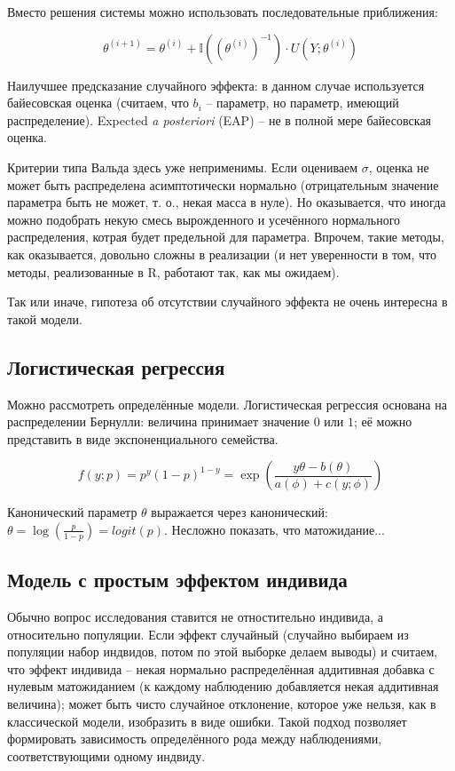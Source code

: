 \documentclass[main.tex]{subfiles}
\begin{document}
Вместо решения системы можно использовать последовательные приближения:

\[ \theta^{(i+1)} = \theta^{(i)} + \mathds I ((\theta^{(i)})^{-1}) \cdot U(Y; \theta^{(i)}) \]

Наилучшее предсказание случайного эффекта: в данном случае используется байесовская оценка (считаем, что $ b_i $ -- параметр, но параметр, имеющий распределение).
Expected \emph{a posteriori} (EAP) -- не в полной мере байесовская оценка.

Критерии типа Вальда здесь уже неприменимы.
Если оцениваем $ \sigma $, оценка не может быть распределена асимптотически нормально (отрицательным значение параметра быть не может, т. о., некая масса в нуле).
Но оказывается, что иногда можно подобрать некую смесь вырожденного и усечённого нормального распределения, котрая будет предельной для параметра.
Впрочем, такие методы, как оказывается, довольно сложны в реализации (и нет уверенности в том, что методы, реализованные в  R, работают так, как мы ожидаем).

Так или иначе, гипотеза об отсутствии случайного эффекта не очень интересна в такой модели.

\subsection{Логистическая регрессия}

Можно рассмотреть определённые модели.
Логистическая регрессия основана на распределении Бернулли: величина принимает значение $ 0 $ или $ 1 $; её можно представить в виде экспоненциального семейства.

\[ f(y;p) = p^y (1-p)^{1-y} = \exp \left( \frac{y\theta - b(\theta)}{a(\phi) +c(y;\phi)} \right) \]

Канонический параметр $ \theta $ выражается через канонический: $ \theta = \log \left( \frac{p}{1-p} \right) = logit(p) $.
Несложно показать, что матожидание... %

\subsection{ Модель с простым эффектом индивида }
Обычно вопрос исследования ставится не отностительно индивида, а относительно популяции.
Если эффект случайный (случайно выбираем из популяции набор индвидов, потом по этой выборке делаем выводы) и считаем, что эффект индивида -- некая нормально распределённая аддитивная добавка с нулевым матожиданием (к каждому наблюдению добавляется некая аддитивная величина); может быть чисто случайное отклонение, которое уже нельзя, как в классической модели, изобразить в виде ошибки.
Такой подход позволяет формировать зависимость определённого рода между наблюдениями, соответствующими одному индвиду.
\end{document}
